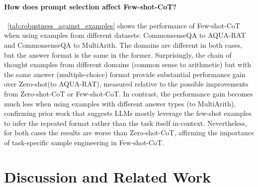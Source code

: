 \documentclass{article}
\newcommand{\CoT}{chain of thought\xspace}
\newcommand{\ours}{Zero-shot-CoT\xspace}
\newcommand{\theirs}{Few-shot-CoT\xspace}
\newcommand{\theirsz}{Zero-shot\xspace}
\begin{document}
\paragraph{How does prompt selection affect \theirs?}
~\autoref{tab:robustness_against_examples} shows the performance of \theirs when using examples from different datasets: CommonsenseQA to AQUA-RAT and CommonsenseQA to MultiArith. 
The domains are different in both cases, but the answer format is the same in the former. 
Surprisingly, the \CoT examples from different domains (common sense to arithmetic) but with the same answer (multiple-choice) format provide substantial performance gain over \theirsz (to AQUA-RAT), measured relative to the possible improvements from \ours or \theirs. In contrast, the performance gain becomes much less when using examples with different answer types (to MultiArith), confirming prior work \citep{min2022rethinking} that suggests LLMs mostly leverage the few-shot examples to infer the repeated format rather than the task itself in-context. 
Nevertheless, for both cases the results are worse than \ours, affirming the importance of task-specific sample engineering in \theirs.





\section{Discussion and Related Work}
\end{document}
